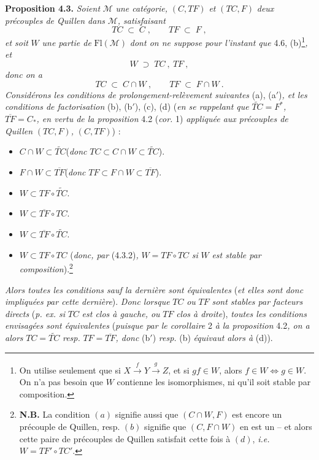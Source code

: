 \documentclass[11pt]{article}
\newcommand{\msp}[1]{\marginpar{\footnotesize [#1]}}
\newcommand{\Fl}{\mathrm{Fl}}
\begin{document}
\textbf{Proposition 4.3.} \textit{Soient} $\mathcal{M}$ \textit{une catégorie,} $(C,TF)$ \textit{et} $(TC,F)$ \textit{deux précouples de Quillen dans} $\mathcal{M}$\textit{, satisfaisant}
\[
TC \;\subset\; C\;, \qquad TF \;\subset\; F\;,
\tag*{(4.3.1)}
\]
\textit{et soit} $W$ \textit{une partie de} $\Fl(\mathcal{M})$ \textit{dont on ne suppose pour l'instant que} 4.6, (b)\footnote[10]{On utilise seulement que si $X\xrightarrow{\;f\;}Y\xrightarrow{\;g\;}Z$, et si $gf\in W$, alors $f\in W\Longleftrightarrow g\in W$. On n'a pas besoin que $W$ contienne les isomorphismes, ni qu'il soit stable par composition.}\textit{, et} %
\[
W \;\supset\; TC\ ,\ TF\ ,
\tag*{(4.3.2)}
\]
\textit{donc on a}
\[
TC \;\subset\; C\cap W\ , \qquad TF \;\subset\; F\cap W\ .
\tag*{(4.3.3)}
\]
\textit{Considérons les conditions de prolongement-relèvement suivantes} (a), (a$'$)\textit{, et les conditions de factorisation} (b), (b$'$), (c), (d) (\textit{en se rappelant que} $\widetilde{TC}=F^*$\textit{,} $\overline{TF}=C_*$\textit{, en vertu de la proposition} 4.2 (\textit{cor.} 1) \textit{appliquée aux précouples de Quillen} $(TC,F)$\textit{,} $(C,TF)$) :
\begin{itemize}[leftmargin=2.5em]
\item[a)] $C\cap W\subset\widetilde{TC}$\quad (\textit{donc} $TC\subset C\cap W\subset\widetilde{TC}$).
\item[a$'$)] $F\cap W\subset\overline{TF}$\quad (\textit{donc} $TF\subset F\cap W\subset\overline{TF}$).
\item[b)] $W\subset TF\circ\widetilde{TC}$.
\item[b$'$)] $W\subset\overline{TF}\circ TC$.
\item[c)] $W\subset\overline{TF}\circ\widetilde{TC}$.
\item[d)] $W\subset TF{\circ}TC$ (\textit{donc, par} (4.3.2)\textit{,} $W=TF{\circ}TC$ \textit{si} $W$ \textit{est stable par composition}).\footnote[11]{\textbf{N.B.} La condition $(a)$ signifie aussi que $(C\cap W,F)$ est encore un précouple de Quillen, resp. $(b)$ signifie que $(C,F\cap W)$ en est un -- et alors cette paire de précouples de Quillen satisfait cette fois à $(d)$, \textit{i.e.} $W=TF'\circ TC'$.} %
\end{itemize}

\msp{page 33}
\textit{Alors toutes les conditions sauf la dernière sont équivalentes} (\textit{et elles sont donc impliquées par cette dernière}). \textit{Donc lorsque} $TC$ \textit{ou} $TF$ \textit{sont stables par facteurs directs} (\textit{p. ex. si} $TC$ \textit{est clos à gauche, ou} $TF$ \textit{clos à droite}), \textit{toutes les conditions envisagées sont équivalentes} (\textit{puisque par le corollaire} 2 \textit{à la proposition} 4.2\textit{, on a alors} $TC=\widetilde{TC}$ \textit{resp.} $TF=\overline{TF}$\textit{, donc} (b$'$) \textit{resp.} (b) \textit{équivaut alors à} (d)).
\end{document}
